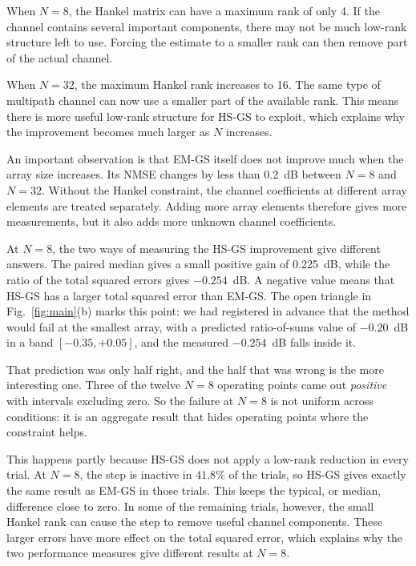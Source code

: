 \documentclass[journal]{IEEEtran}
\begin{document}
When $N=8$, the Hankel matrix can have a maximum rank of only 4. If the channel
contains several important components, there may not be much low-rank structure
left to use. Forcing the estimate to a smaller rank can then remove part of the
actual channel.

When $N=32$, the maximum Hankel rank increases to 16. The same type of
multipath channel can now use a smaller part of the available rank. This means
there is more useful low-rank structure for HS-GS to exploit, which explains why
the improvement becomes much larger as $N$ increases.

An important observation is that EM-GS itself does not improve much when the
array size increases. Its NMSE changes by less than 0.2~dB between $N=8$ and
$N=32$. Without the Hankel constraint, the channel coefficients at different
array elements are treated separately. Adding more array elements therefore
gives more measurements, but it also adds more unknown channel coefficients.

At $N=8$, the two ways of measuring the HS-GS improvement give different
answers. The paired median gives a small positive gain of 0.225~dB, while the
ratio of the total squared errors gives $-0.254$~dB. A negative value means
that HS-GS has a larger total squared error than EM-GS. The open triangle in
Fig.~\ref{fig:main}(b) marks this point: we had registered in advance that the
method would fail at the smallest array, with a predicted ratio-of-sums value
of $-0.20$~dB in a band $[-0.35,+0.05]$, and the measured $-0.254$~dB falls
inside it.

That prediction was only half right, and the half that was wrong is the more
interesting one. Three of the twelve $N=8$ operating points came out
\emph{positive} with intervals excluding zero. So the failure at $N=8$ is not
uniform across conditions: it is an aggregate result that hides operating
points where the constraint helps.

This happens partly because HS-GS does not apply a low-rank reduction in every
trial. At $N=8$, the step is inactive in $41.8\%$ of the trials, so HS-GS gives
exactly the same result as EM-GS in those trials. This keeps the typical, or
median, difference close to zero. In some of the remaining trials, however, the
small Hankel rank can cause the step to remove useful channel components. These
larger errors have more effect on the total squared error, which explains why
the two performance measures give different results at $N=8$.
\end{document}
